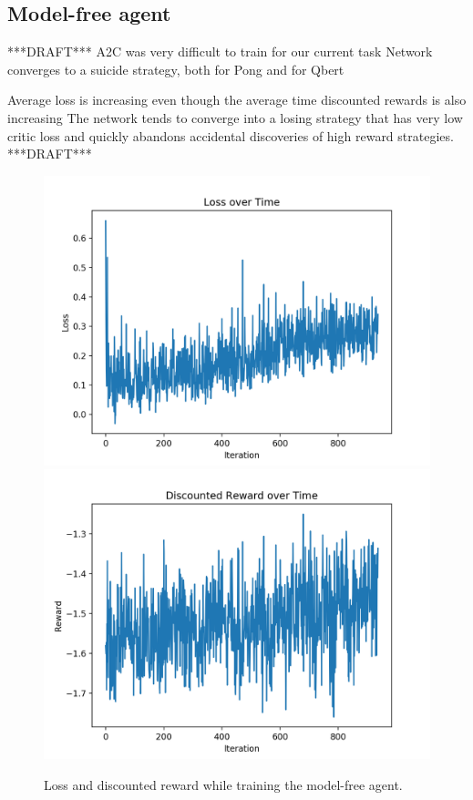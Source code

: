 \documentclass[10pt, twocolumn]{article}
\begin{document}
\subsection{Model-free agent}

***DRAFT***
A2C was very difficult to train for our current task
Network converges to a suicide strategy, both for Pong and for Qbert

Average loss is increasing even though the average time discounted rewards is also increasing
The network tends to converge into a losing strategy that has very low critic loss and quickly abandons accidental discoveries of high reward strategies.
***DRAFT***


\begin{figure}[h]
\centering
\includegraphics[scale=0.4]{losses}
\includegraphics[scale=0.4]{rewards}
\caption{Loss and discounted reward while training the model-free agent.}
\label{plots}
\end{figure}
\end{document}
